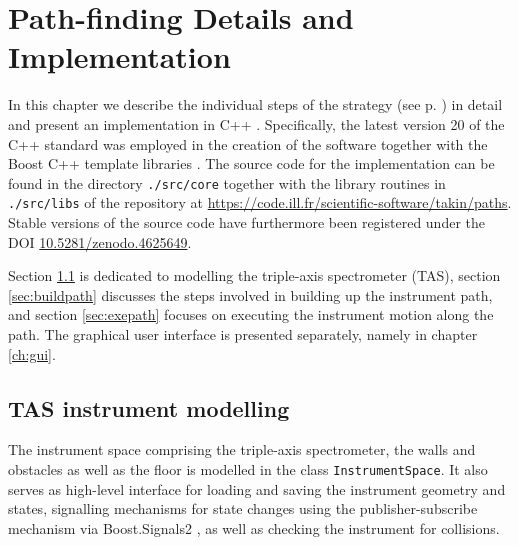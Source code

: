 %
%

\chapter{Path-finding Details and Implementation}
\label{ch:impl}

In this chapter we describe the individual steps of the strategy (see p. \pageref{sec:strategy}) in detail
and present an implementation in C++ \cite{Stroustrup2008, Stroustrup2018}. Specifically,
the latest version 20 of the C++ standard \cite{ISOCPP20} was employed in the creation of the software
together with the Boost C++ template libraries \cite{web_boost}. The source code for the implementation
can be found in the directory \lstinline|./src/core| together with the library routines in \lstinline|./src/libs|
of the repository at \url{https://code.ill.fr/scientific-software/takin/paths}. Stable versions of the
source code have furthermore been registered under the DOI \href{https://doi.org/10.5281/zenodo.4625649}{10.5281/zenodo.4625649}.

Section \ref{sec:tasmodel} is dedicated to modelling the triple-axis spectrometer (TAS), 
section \ref{sec:buildpath} discusses the steps involved in building up the instrument path, 
and section \ref{sec:exepath} focuses on executing the instrument motion along the path.
The graphical user interface is presented separately, namely in chapter \ref{ch:gui}.





\section{TAS instrument modelling}
\label{sec:tasmodel}

The instrument space comprising the triple-axis spectrometer, the walls and obstacles as well as the floor is modelled in
the class \lstinline[language=C++]|InstrumentSpace|. It also serves as high-level interface for loading and saving
the instrument geometry and states, signalling mechanisms for state changes using the publisher-subscribe mechanism
via Boost.Signals2 \cite{web_boost_signals}, as well as checking the instrument for collisions.

